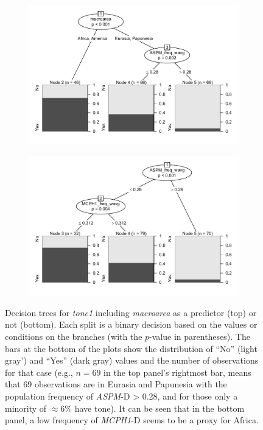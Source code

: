 \documentclass[twoside,twocolumn]{article}
\begin{document}
\begin{figure}[h]
  \centering
  \begin{subfigure}{0.75\linewidth}
    \includegraphics[width=\textwidth]{../../code/figures/tone1_decision_trees_macroarea}
  \end{subfigure}
  \begin{subfigure}{0.75\linewidth}
    \includegraphics[width=\textwidth]{../../code/figures/tone1_decision_trees_nomacroarea}
  \end{subfigure}
  \caption{Decision trees for \textit{tone1} including \textit{macroarea} as a predictor (top) or not (bottom). Each split is a binary decision based on the values or conditions on the branches (with the $p$-value in parentheses). The bars at the bottom of the plots show the distribution of ``No'' (light gray') and ``Yes'' (dark gray) values and the number of observations for that case (e.g., $n = 69$ in the top panel's rightmost bar, means that 69 observations are in Eurasia and Papunesia with the population frequency of \textit{ASPM}-D > 0.28, and for those only a minority of $\approx 6\%$ have tone). It can be seen that in the bottom panel, a low frequency of \textit{MCPH1}-D seems to be a proxy for Africa.}
  \label{Fig:tone1_decision_trees}
\end{figure}
\end{document}
